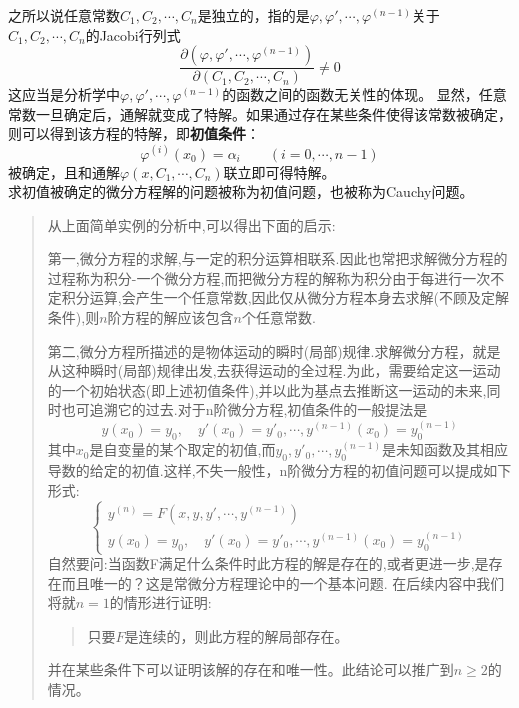 \documentclass[UTF8]{book}
\begin{document}
    之所以说任意常数$ C_1,C_2,\cdots,C_n $是独立的，指的是$ \varphi,\varphi',\cdots,\varphi^{(n-1)} $关于$ C_1,C_2,\cdots,C_n $的Jacobi行列式$$ \frac{\partial(\varphi,\varphi',\cdots,\varphi^{(n-1)})}{\partial(C_1,C_2,\cdots,C_n)}\neq 0 $$
    这应当是分析学中$ \varphi,\varphi',\cdots,\varphi^{(n-1)} $的函数之间的函数无关性的体现。%
    显然，任意常数一旦确定后，通解就变成了特解。如果通过存在某些条件使得该常数被确定，则可以得到该方程的特解，即\textbf{初值条件}：$$ \varphi^{(i)}(x_0)=\alpha_i\qquad(i=0,\cdots,n-1) $$被确定，且和通解$ \varphi(x,C_1,\cdots,C_n) $联立即可得特解。\\ 求初值被确定的微分方程解的问题被称为初值问题，也被称为Cauchy问题。
    \begin{quotation}
        从上面简单实例的分析中,可以得出下面的启示:
        
        第一,微分方程的求解,与一定的积分运算相联系.因此也常把求解微分方程的过程称为积分-一个微分方程,而把微分方程的解称为积分由于每进行一次不定积分运算,会产生一个任意常数,因此仅从微分方程本身去求解(不顾及定解条件),则$ n $阶方程的解应该包含$ n $个任意常数.
        
        第二,微分方程所描述的是物体运动的瞬时(局部)规律.求解微分方程，就是从这种瞬时(局部)规律出发,去获得运动的全过程.为此，需要给定这一运动的一个初始状态(即上述初值条件),并以此为基点去推断这一运动的未来,同时也可追溯它的过去.对于n阶微分方程,初值条件的一般提法是$$ y(x_0) = y_0,\quad y'(x_0) = y'_0 ,\cdots, y^{(n-1)}(x_0) = y_0^{(n-1)} $$其中$ x_0 $是自变量的某个取定的初值,而$ y_0, y'_0,\cdots, y_0^{(n-1)} $是未知函数及其相应导数的给定的初值.这样,不失一般性，n阶微分方程的初值问题可以提成如下形式:
        $$ \begin{cases}
            y^{(n)}=F(x,y,y',\cdots,y^{(n-1)})\\ 
            y(x_0) = y_0,\quad y'(x_0) = y'_0 ,\cdots,y^{(n-1)}(x_0) = y_0^{(n-1)}
        \end{cases} $$自然要问:当函数F满足什么条件时此方程的解是存在的,或者更进一步,是存在而且唯一的？这是常微分方程理论中的一个基本问题. 在后续内容中我们将就$ n= 1 $的情形进行证明:\begin{quote}
            只要$ F $是连续的，则此方程的解局部存在。
        \end{quote}
        并在某些条件下可以证明该解的存在和唯一性。此结论可以推广到$ n\geq 2 $的情况。
    \end{quotation}
\end{document}
